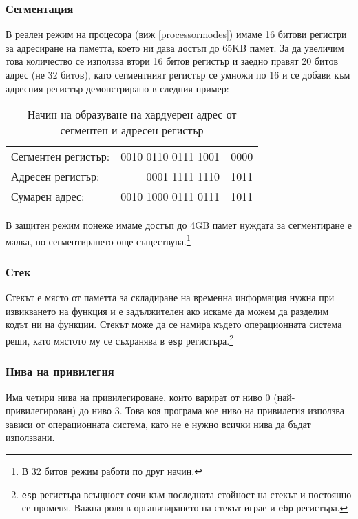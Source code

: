 \subsubsection{Сегментация} \label{segmentation}
В реален режим на процесора (виж \ref{processormodes}) имаме 16 битови регистри за адресиране на паметта, което ни дава достъп до 65KB памет. За да увеличим това количество се използва втори 16 битов регистър и заедно правят 20 битов адрес (не 32 битов), като сегментният регистър се умножи по 16 и се добави към адресния регистър демонстрирано в следния пример: \par
\begin{table}[ht]
  \centering
  \begin{tabular}{l r@{\hskip 3pt}l}
    Сегментен регистър: & 0010 0110 0111 1001 & \color{red}0000 \\
    Адресен регистър: & 0001 1111 1110 & 1011 \\
    \hline
    Сумарен адрес: & 0010 1000 0111 0111 & 1011 \\
  \end{tabular}
  \caption{Начин на образуване на хардуерен адрес от сегментен и адресен регистър}
  \label{segmentationexample}
\end{table}
В защитен режим понеже имаме достъп до 4GB памет нуждата за сегментиране е малка, но сегментирането още съществува.\footnote{В 32 битов режим работи по друг начин.}

\subsubsection{Стек}
Стекът е място от паметта за складиране на временна информация нужна при извикването на функция и е задължителен ако искаме да можем да разделим кодът ни на функции. Стекът може да се намира където операционната система реши, като мястото му се съхранява в {\tt esp} регистъра.\footnote{{\tt esp} регистъра всъщност сочи към последната стойност на стекът и постоянно се променя. Важна роля в организирането на стекът играе и {\tt ebp} регистъра.}

\subsubsection{Нива на привилегия}
Има четири нива на привилегироване, които варират от ниво 0 (най-привилеги\-ро\-ван) до ниво 3. Това коя програма кое ниво на привилегия използва зависи от операционната система, като не е нужно всички нива да бъдат използвани.


